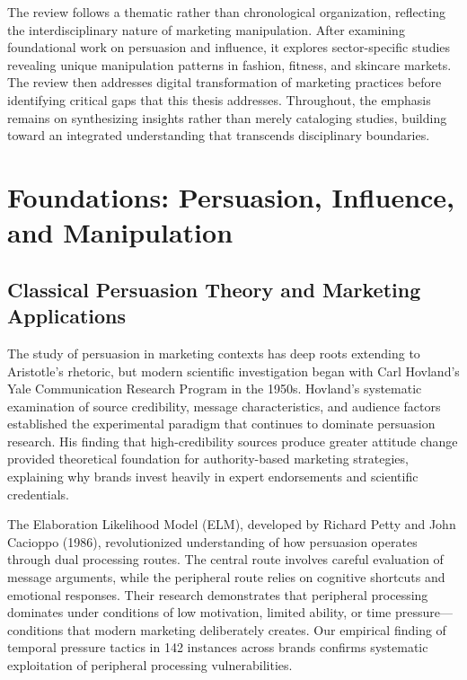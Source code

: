 The review follows a thematic rather than chronological organization, reflecting the interdisciplinary nature of marketing manipulation. After examining foundational work on persuasion and influence, it explores sector-specific studies revealing unique manipulation patterns in fashion, fitness, and skincare markets. The review then addresses digital transformation of marketing practices before identifying critical gaps that this thesis addresses. Throughout, the emphasis remains on synthesizing insights rather than merely cataloging studies, building toward an integrated understanding that transcends disciplinary boundaries.

\section{Foundations: Persuasion, Influence, and Manipulation}
\label{sec:foundations}

\subsection{Classical Persuasion Theory and Marketing Applications}

The study of persuasion in marketing contexts has deep roots extending to Aristotle's rhetoric, but modern scientific investigation began with Carl Hovland's Yale Communication Research Program in the 1950s. Hovland's systematic examination of source credibility, message characteristics, and audience factors established the experimental paradigm that continues to dominate persuasion research. His finding that high-credibility sources produce greater attitude change provided theoretical foundation for authority-based marketing strategies, explaining why brands invest heavily in expert endorsements and scientific credentials.

The Elaboration Likelihood Model (ELM), developed by Richard Petty and John Cacioppo (1986), revolutionized understanding of how persuasion operates through dual processing routes. The central route involves careful evaluation of message arguments, while the peripheral route relies on cognitive shortcuts and emotional responses. Their research demonstrates that peripheral processing dominates under conditions of low motivation, limited ability, or time pressure—conditions that modern marketing deliberately creates. Our empirical finding of temporal pressure tactics in 142 instances across brands confirms systematic exploitation of peripheral processing vulnerabilities.

